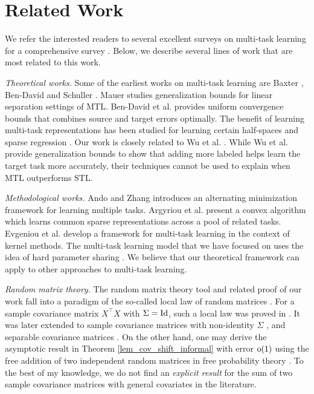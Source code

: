 \section{Related Work}

We refer the interested readers to several excellent surveys on multi-task  learning for a comprehensive survey \cite{PY09,R17,ZY17,V20}.
Below, we describe several lines of work that are most related to this work.

\textit{Theoretical works.}
Some of the earliest works on multi-task learning are Baxter \cite{B00}, Ben-David and Schuller \cite{BS03}.
Mauer \cite{M06} studies generalization bounds for linear separation settings of MTL.
Ben-David et al. \cite{BBCK10} provides uniform convergence bounds that combines source and target errors optimally.
The benefit of learning multi-task representations has been studied for learning certain half-spaces \cite{MPR16} and sparse regression \cite{LPTV09,LPVT11}.
Our work is closely related to Wu et al. \cite{WZR20}.
While Wu et al. provide generalization bounds to show that adding more labeled helps learn the target task more accurately, their techniques cannot be used to explain when MTL outperforms STL.

\textit{Methodological works.}
Ando and Zhang \cite{AZ05} introduces an alternating minimization framework for learning multiple tasks.
Argyriou et al. \cite{AEP08} present a convex algorithm which learns common sparse representations across a pool of related tasks.
Evgeniou et al. \cite{EMP05} develop a framework for multi-task learning in the context of kernel methods.
The multi-task learning model that we have focused on uses the idea of hard parameter sharing \cite{C93,KD12,R17}.
We believe that our theoretical framework can apply to other approaches to multi-task learning.

\textit{Random matrix theory.}
The random matrix theory tool and related proof of our work fall into a paradigm of the so-called local law of random matrices \cite{erdos2017dynamical}.
For a sample covariance matrix $X^\top X$ with $\Sigma=\operatorname{Id}$, such a local law was proved in \cite{isotropic}.
It was later extended to sample covariance matrices with non-identity $\Sigma$ \cite{Anisotropic}, and separable covariance matrices \cite{yang2019spiked}. On the other hand, one may derive the asymptotic result in Theorem \ref{lem_cov_shift_informal} with error $\operatorname{o}(1)$ using the free addition of two independent random matrices in free probability theory \cite{nica2006lectures}. To the best of my knowledge, we do not find an {\it explicit result} for the sum of two sample covariance matrices with general covariates in the literature.


